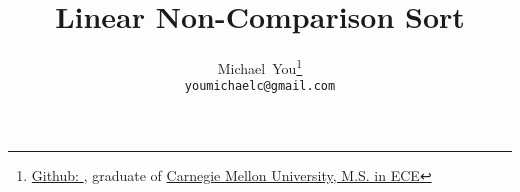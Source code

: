 \usepackage{arxiv}
\usepackage{util}

\usepackage[utf8]{inputenc} %
\usepackage[T1]{fontenc}    %
\usepackage{hyperref}       %
\usepackage{url}            %
\usepackage{booktabs}       %
\usepackage{amsfonts}       %
\usepackage{nicefrac}       %
\usepackage{microtype}      %
\usepackage{lipsum}		%
\usepackage{graphicx}
\usepackage{natbib}
\usepackage{doi}

\title{Linear Non-Comparison Sort}

\author{
  Michael~You\thanks{\href{https://github.com/mikinty}{Github: }, graduate of \href{https://www.cmu.edu/}{Carnegie Mellon University, M.S. in ECE}} \\
  \texttt{youmichaelc@gmail.com}
}

\renewcommand{\headeright}{Michael You}
\renewcommand{\undertitle}{}
\renewcommand{\shorttitle}{Parallel Non-Comparison Hardware Sort}

